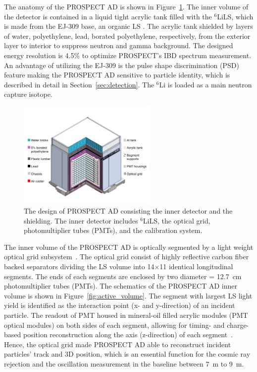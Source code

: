     The anatomy of the PROSPECT AD is shown in Figure~\ref{fig:PROSPECT_AD}.
    The inner volume of the detector is contained in a liquid tight acrylic tank filled with the $^{6}$LiLS, which is made from the EJ-309 base, an organic LS \cite{bib:lspaper}.
    The acrylic tank shielded by layers of water, polyethylene, lead, borated polyethylene, respectively, from the exterior layer to interior to suppress neutron and gamma background.
    The designed energy resolution is 4.5\% to optimize PROSPECT's IBD spectrum measurement.
    An advantage of utilizing the EJ-309 is the pulse shape discrimination (PSD) feature making the PROSPECT AD sensitive to particle identity, which is described in detail in Section~\ref{sec:detection}.
    The $^{6}$Li is loaded as a main neutron capture isotope.

\begin{figure}
    \centering
    \includegraphics[trim = 0cm 2cm 0cm 2cm, clip,width=0.6\textwidth]{Figures/DetectorDesign.pdf}
    \caption[The design of PROSPECT AD]{The design of PROSPECT AD consisting the inner detector and the shielding.
    The inner detector includes $^{6}$LiLS, the optical grid, photomultiplier tubes (PMTs), and the calibration system.
    }
    \label{fig:PROSPECT_AD}
\end{figure}

    The inner volume of the PROSPECT AD is optically segmented by a light weight optical grid subsystem~\cite{bib:prospect_og}.
    The optical grid consist of highly reflective carbon fiber backed separators dividing the LS volume into 14$\times$11 identical longitudinal segments. 
    The ends of each segments are enclosed by two diameter = 12.7~cm photomultiplier tubes (PMTs).
    The schematics of the PROSPECT AD inner volume is shown in Figure~\ref{fig:active_volume}.
    The segment with largest LS light yield is identified as the interaction point (x- and y-direction) of an incident particle.
    The readout of PMT housed in mineral-oil filled acrylic modules (PMT optical modules) on both sides of each segment, allowing for timing- and charge-based position reconstruction along the axis (z-direction) of each segment~\cite{bib:P50, bib:P20}.
    Hence, the optical grid made PROSPECT AD able to reconstruct incident particles' track and 3D position, which is an essential function for the cosmic ray rejection and the oscillation measurement in the baseline between 7~m to 9~m.
    
